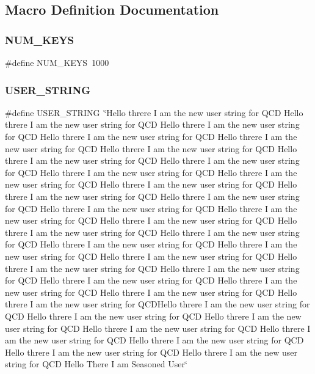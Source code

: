 \subsection{Macro Definition Documentation}
\mbox{\label{adat-devel_2other__libs_2filedb_2src_2AllConfCreateTest_8cpp_a9a8c7403a867e0c9543467ee8754050d}} 
\subsubsection{\texorpdfstring{NUM\_KEYS}{NUM\_KEYS}}
{\footnotesize\ttfamily \#define N\+U\+M\+\_\+\+K\+E\+YS~1000}

\mbox{\label{adat-devel_2other__libs_2filedb_2src_2AllConfCreateTest_8cpp_a5fdc86a0c07ccece3ef65e2f46c0ffd4}} 
\subsubsection{\texorpdfstring{USER\_STRING}{USER\_STRING}}
{\footnotesize\ttfamily \#define U\+S\+E\+R\+\_\+\+S\+T\+R\+I\+NG~\char`\"{}Hello threre I am the new user string for Q\+CD Hello threre I am the new user string for Q\+CD Hello threre I am the new user string for Q\+CD Hello threre I am the new user string for Q\+CD Hello threre I am the new user string for Q\+CD Hello threre I am the new user string for Q\+CD Hello threre I am the new user string for Q\+CD Hello threre I am the new user string for Q\+CD Hello threre I am the new user string for Q\+CD Hello threre I am the new user string for Q\+CD Hello threre I am the new user string for Q\+CD Hello threre I am the new user string for Q\+CD Hello threre I am the new user string for Q\+CD Hello threre I am the new user string for Q\+CD Hello threre I am the new user string for Q\+CD Hello threre I am the new user string for Q\+CD Hello threre I am the new user string for Q\+CD Hello threre I am the new user string for Q\+CD Hello threre I am the new user string for Q\+CD Hello threre I am the new user string for Q\+CD Hello threre I am the new user string for Q\+CD Hello threre I am the new user string for Q\+CD Hello threre I am the new user string for Q\+CD Hello threre I am the new user string for Q\+CD Hello threre I am the new user string for Q\+CD Hello threre I am the new user string for Q\+CD Hello threre I am the new user string for Q\+C\+D\+Hello threre I am the new user string for Q\+CD  Hello threre I am the new user string for Q\+CD Hello threre I am the new user string for Q\+CD Hello threre I am the new user string for Q\+CD Hello threre I am the new user string for Q\+CD Hello threre I am the new user string for Q\+CD Hello threre I am the new user string for Q\+CD Hello threre I am the new user string for Q\+CD Hello There I am Seasoned User\char`\"{}}




